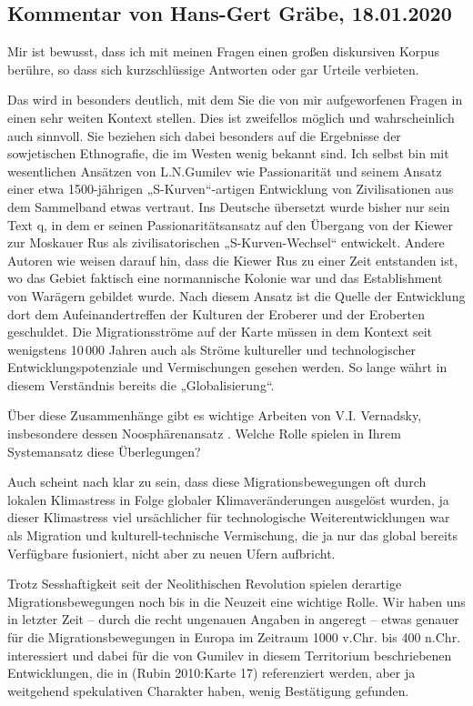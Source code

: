 \documentclass[11pt,a4paper]{article}
\begin{document}
\subsection{Kommentar von Hans-Gert Gräbe, 18.01.2020}

Mir ist bewusst, dass ich mit meinen Fragen einen großen diskursiven Korpus
berühre, so dass sich kurzschlüssige Antworten oder gar Urteile verbieten.

Das wird in \cite{Rubin2010} besonders deutlich, mit dem Sie die von mir
aufgeworfenen Fragen in einen sehr weiten Kontext stellen. Dies ist zweifellos
möglich und wahrscheinlich auch sinnvoll. Sie beziehen sich dabei besonders
auf die Ergebnisse der sowjetischen Ethnografie, die im Westen wenig bekannt
sind.  Ich selbst bin mit wesentlichen Ansätzen von L.N.Gumilev wie
Passionarität und seinem Ansatz einer etwa 1500-jährigen „S-Kurven“-artigen
Entwicklung von Zivilisationen aus dem Sammelband \cite{Gumilev1994} etwas
vertraut.  Ins Deutsche übersetzt wurde bisher nur sein Text
\cite{Gumilev2017}q, in dem er seinen Passionaritätsansatz auf den Übergang
von der Kiewer zur Moskauer Rus als zivilisatorischen „S-Kurven-Wechsel“
entwickelt.  Andere Autoren wie \cite{Adji2011} weisen darauf hin, dass die
Kiewer Rus zu einer Zeit entstanden ist, wo das Gebiet faktisch eine
normannische Kolonie war und das Establishment von Warägern gebildet wurde.
Nach diesem Ansatz ist die Quelle der Entwicklung dort dem Aufeinandertreffen
der Kulturen der Eroberer und der Eroberten geschuldet.  Die Migrationsströme
auf der Karte \cite[Karte 5]{Rubin2010} müssen in dem Kontext seit wenigstens
10\,000 Jahren auch als Ströme kultureller und technologischer
Entwicklungspotenziale und Vermischungen gesehen werden. So lange währt in
diesem Verständnis bereits die „Globalisierung“.

Über diese Zusammenhänge gibt es wichtige Arbeiten von V.I. Vernadsky,
insbesondere dessen Noosphärenansatz \cite{Vernadsky1997}. Welche Rolle
spielen in Ihrem Systemansatz diese Überlegungen?

Auch scheint nach \cite{KlixLanius1999} klar zu sein, dass diese
Migrationsbewegungen oft durch lokalen Klimastress in Folge globaler
Klimaveränderungen ausgelöst wurden, ja dieser Klimastress viel ursächlicher
für technologische Weiterentwicklungen war als Migration und
kulturell-technische Vermischung, die ja nur das global bereits Verfügbare
fusioniert, nicht aber zu neuen Ufern aufbricht.

Trotz Sesshaftigkeit seit der Neolithischen Revolution spielen derartige
Migrationsbewegungen noch bis in die Neuzeit eine wichtige Rolle.  Wir haben
uns in letzter Zeit -- durch die recht ungenauen Angaben in \cite{Adji2011}
angeregt -- etwas genauer für die Migrationsbewegungen in Europa im Zeitraum
1000 v.Chr. bis 400 n.Chr. interessiert und dabei für die von Gumilev in
diesem Territorium beschriebenen Entwicklungen, die in (Rubin 2010:Karte 17)
referenziert werden, aber ja weitgehend spekulativen Charakter haben, wenig
Bestätigung gefunden.
\end{document}
